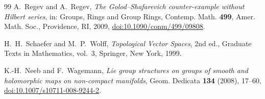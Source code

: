 \documentclass[11pt]{article}
\theoremstyle{remark}
\begin{document}
\begin{thebibliography}{99}
A.~Regev and A.~Regev,
\emph{The Golod--Shafarevich counter-example without Hilbert series},
in: Groups, Rings and Group Rings, Contemp. Math. \textbf{499},
Amer. Math. Soc., Providence, RI, 2009,
\href{https://doi.org/10.1090/conm/499/09808}{doi:10.1090/conm/499/09808}.

H.~H.~Schaefer and M.~P.~Wolff,
\emph{Topological Vector Spaces}, 2nd ed.,
Graduate Texts in Mathematics, vol.~3, Springer, New York, 1999.

K.-H.~Neeb and F.~Wagemann,
\emph{Lie group structures on groups of smooth and holomorphic maps on
non-compact manifolds},
Geom. Dedicata \textbf{134} (2008), 17--60,
\href{https://doi.org/10.1007/s10711-008-9244-2}{doi:10.1007/s10711-008-9244-2}.

\end{thebibliography}
\end{document}
